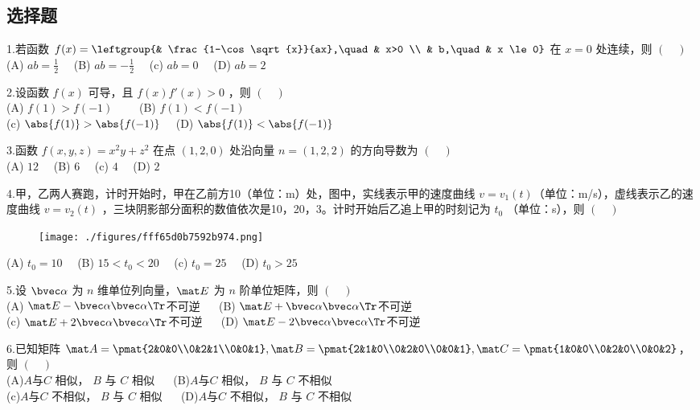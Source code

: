 
\subsection{选择题}
1.若函数 $f(x)=\leftgroup{& \frac{1-\cos \sqrt{x}}{ax},\quad  & x>0 \\ & b,\quad & x \le 0}$ 在 $x=0$ 处连续，则 $(\quad)$\\
(A) $ab=\frac{1}{2} \quad$
(B) $ab=-\frac{1}{2} \quad$
(c) $ab=0 \quad$
(D) $ab=2 \quad$

2.设函数 $f(x)$ 可导，且 $f(x)f'(x)>0$ ，则 $(\quad)$ \\
(A) $f(1)>f(-1) \qquad$
(B) $f(1)<f(-1) \quad$\\
(c) $\abs{f(1)}>\abs{f(-1)} \quad$
(D) $\abs{f(1)}<\abs{f(-1)} $

3.函数 $f(x,y,z)=x^2y+z^2$ 在点 $(1,2,0)$ 处沿向量 $n=(1,2,2)$ 的方向导数为 $(\quad)$\\
(A) $ 12 \quad$
(B) $  6 \quad$
(c) $ 4 \quad$
(D) $2 \quad$


4.甲，乙两人赛跑，计时开始时，甲在乙前方10（单位：m）处，图中，实线表示甲的速度曲线 $v=v_1(t)$（单位：m/s），虚线表示乙的速度曲线 $v=v_2(t)$ ，三块阴影部分面积的数值依次是10，20，3。计时开始后乙追上甲的时刻记为 $t_0$ （单位：s），则 $(\quad)$\\
\begin{figure}[ht]
\centering
\texttt{[image: ./figures/fff65d0b7592b974.png]}
\caption{} \label{fig_PeeM17_1}
\end{figure}
(A) $t_0=10 \quad$
(B) $15<t_0<20 \quad $
(c) $t_0=25\quad$
(D) $t_0>25$

5.设 $\bvec \alpha$ 为 $n$ 维单位列向量，$\mat E$ 为 $n$ 阶单位矩阵，则 $(\quad)$\\
(A)  $\mat E- \bvec \alpha \bvec \alpha \Tr$不可逆 $\quad$
(B) $\mat E+ \bvec \alpha \bvec \alpha \Tr$不可逆\\
(c) $\mat E+ 2\bvec \alpha \bvec \alpha \Tr$不可逆 $\quad$
(D) $\mat E- 2\bvec \alpha \bvec \alpha \Tr$不可逆

6.已知矩阵 $\mat A=\pmat{2&0&0\\0&2&1\\0&0&1},\mat B=\pmat{2&1&0\\0&2&0\\0&0&1},\mat C=\pmat{1&0&0\\0&2&0\\0&0&2}$，则 $(\quad)$\\
(A)$A$与$C$ 相似， $B$ 与 $C$ 相似 $\quad$
(B)$A$与$C$ 相似， $B$ 与 $C$ 不相似 \\
(c)$A$与$C$ 不相似， $B$ 与 $C$ 相似 $\quad$
(D)$A$与$C$ 不相似， $B$ 与 $C$ 不相似 $\quad$

